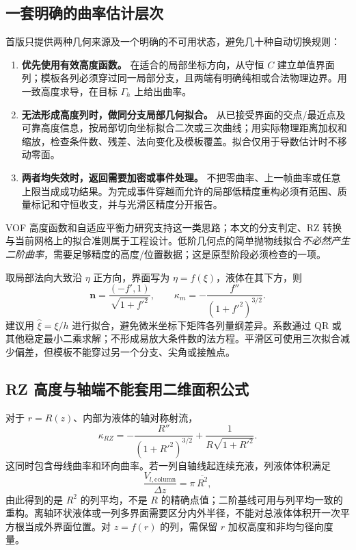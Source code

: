 \documentclass[11pt,a4paper]{article}
\newcommand{\vct}[1]{\boldsymbol{#1}}
\begin{document}
\subsection{一套明确的曲率估计层次}
首版只提供两种几何来源及一个明确的不可用状态，避免几十种自动切换规则：
\begin{enumerate}
\item \textbf{优先使用有效高度函数。} 在适合的局部坐标方向，从守恒 $C$ 建立单值界面列；模板各列必须穿过同一局部分支，且两端有明确纯相或合法物理边界。用一致高度求导，在目标 $\Gamma_h$ 上给出曲率。
\item \textbf{无法形成高度列时，做同分支局部几何拟合。} 从已接受界面的交点/最近点及可靠高度信息，按局部切向坐标拟合二次或三次曲线；用实际物理距离加权和缩放，检查条件数、残差、法向变化及模板覆盖。拟合仅用于导数估计时不移动零面。
\item \textbf{两者均失效时，返回需要加密或事件处理。} 不把零曲率、上一帧曲率或任意上限当成成功结果。为完成事件穿越而允许的局部低精度重构必须有范围、质量标记和守恒收支，并与光滑区精度分开报告。
\end{enumerate}
VOF 高度函数和自适应平衡力研究支持这一类思路\cite{cummins2005,popinet2009}；本文的分支判定、RZ 转换与当前网格上的拟合准则属于工程设计。低阶几何点的简单抛物线拟合\emph{不必然产生二阶曲率}，需要足够精度的高度/位置数据；这是原型阶段必须检查的一项。

取局部法向大致沿 $\eta$ 正方向，界面写为 $\eta=f(\xi)$，液体在其下方，则
\begin{equation}
 \vct n=\frac{(-f',1)}{\sqrt{1+f'^2}},\qquad
 \kappa_m=-\frac{f''}{(1+f'^2)^{3/2}}.
\end{equation}
建议用 $\hat\xi=\xi/h$ 进行拟合，避免微米坐标下矩阵各列量纲差异。系数通过 QR 或其他稳定最小二乘求解；不形成易放大条件数的法方程。平滑区可使用三次拟合减少偏差，但模板不能穿过另一个分支、尖角或接触点。

\subsection{RZ 高度与轴端不能套用二维面积公式}
对于 $r=R(z)$、内部为液体的轴对称射流，
\begin{equation}
 \kappa_{RZ}=-\frac{R''}{(1+R'^2)^{3/2}}
                +\frac{1}{R\sqrt{1+R'^2}}.\label{eq:rzjet}
\end{equation}
这同时包含母线曲率和环向曲率。若一列自轴线起连续充液，列液体体积满足
\begin{equation}
 \frac{V_{l,\mathrm{column}}}{\Delta z}
       =\pi\,\overline{R^2},
\end{equation}
由此得到的是 $R^2$ 的列平均，不是 $R$ 的精确点值；二阶基线可用与列平均一致的重构。离轴环状液体或一列多界面需要区分内外半径，不能对总液体体积开一次平方根当成外界面位置。对 $z=f(r)$ 的列，需保留 $r$ 加权高度和非均匀径向度量。
\end{document}
